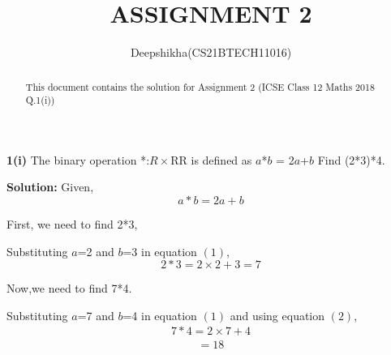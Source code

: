 \documentclass[journal, 12pt, twocolumn]{IEEEtran}
\begin{document}
\title{ASSIGNMENT 2}
\author{Deepshikha(CS21BTECH11016)}
\maketitle

\begin{abstract}
This document contains the solution for Assignment 2 (ICSE Class 12 Maths 2018 Q.1(i))
\end{abstract}

\textbf{1(i)}
The binary operation *:$R\times$R\textrightarrow R is defined as $a$*$b$ = 2$a$+$b$ Find (2*3)*4.


\textbf{Solution:}
Given,
\begin{equation}
     a*b=2a+b\label{eq:1}
\end{equation}

First, we need to find 2*3,


Substituting $a$=2 and $b$=3 in equation $(1)$,
\begin{equation}
    2*3=2\times2+3=7\label{eq:2}
\end{equation}

Now,we need to find 7*4.


Substituting $a$=7 and $b$=4 in equation $(1)$ and using equation $(2)$,
\begin{align*}
    7*4=2\times7+4
\end{align*}
\begin{align*}
      =18
\end{align*}
\end{document}
